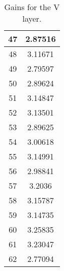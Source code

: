\begin{table}[h]
\begin{subtable}[h]{2in}
{\begin{tabular}{|c|c|}
47	&	2.87516	\\	\hline
48	&	3.11671	\\	\hline
49	&	2.79597	\\	\hline
50	&	2.89624	\\	\hline
51	&	3.14847	\\	\hline
52	&	3.13501	\\	\hline
53	&	2.89625	\\	\hline
54	&	3.00618	\\	\hline
55	&	3.14991	\\	\hline
56	&	2.98841	\\	\hline
57	&	3.2036	\\	\hline
58	&	3.15787	\\	\hline
59	&	3.14735	\\	\hline
60	&	3.25835	\\	\hline
61	&	3.23047	\\	\hline
62	&	2.77094	\\	\hline
        \end{tabular}
        }
        \caption{Gains for the V layer.}
    \end{subtable}
    \quad
    \begin{subtable}[h]{2in}
        \centering{}
\end{subtable}
\end{table}
